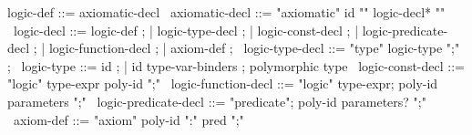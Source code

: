 \begin{syntax}
  logic-def ::= axiomatic-decl
  \
  axiomatic-decl ::= "axiomatic" id "{" logic-decl* "}"
  \
  logic-decl ::= logic-def ;
  | logic-type-decl ;
  | logic-const-decl ;
  | logic-predicate-decl ;
  | logic-function-decl ;
  | axiom-def ;
  \
  logic-type-decl ::= "type" logic-type ";" ;
  \
  logic-type ::= id ;
  | id type-var-binders ; polymorphic type
  \
  logic-const-decl ::=  "logic" type-expr poly-id ";"
  \
  logic-function-decl ::=
  "logic" type-expr;
  poly-id parameters ";"
  \
  logic-predicate-decl ::=
  "predicate";
  poly-id parameters? ";"
  \
  axiom-def ::= "axiom" poly-id ":" pred ";" 
\end{syntax}

